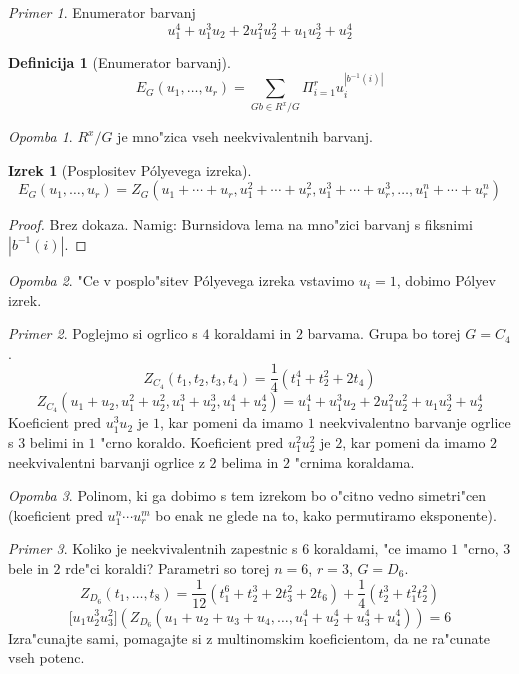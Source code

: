 \documentclass[a4paper,12pt]{article}
\theoremstyle{definition}
\newtheorem{defn}[counter]{Definicija}
\newtheorem{theorem}[counter]{Izrek}
\theoremstyle{remark}
\newtheorem*{ex}{Primer}
\newtheorem*{rem}{Opomba}
\begin{document}
\label{TODO: tega lani ni blo, tkoda ne znam nc dopisat}
\begin{ex}
	Enumerator barvanj
	\[ u_1^4 + u_1^3u_2 + 2u_1^2u_2^2+u_1u_2^3+u_2^4 \]
\end{ex}
\begin{defn}[Enumerator barvanj]
	$$ E_G(u_1, \ldots, u_r) = \sum_{Gb \in R^x/G} \Pi_{i=1}^r u_i^{ |b^{-1}(i)| } $$
\end{defn}
\begin{rem}
	$R^x/G$ je mno"zica vseh neekvivalentnih barvanj.
\end{rem}

\begin{theorem}[Posplositev P\'{o}lyevega izreka]
	\[ E_G(u_1, \ldots, u_r) = Z_G(u_1 + \cdots + u_r, u^2_1 + \cdots + u^2_r, u^3_1 + \cdots + u^3_r, \ldots, u^n_1 + \cdots + u^n_r) \]
\end{theorem}
\begin{proof}
	Brez dokaza. Namig: Burnsidova lema na mno"zici barvanj s fiksnimi $|b^{-1}(i)|$.
\end{proof}
\begin{rem}\label{TODO: elaborate, I don't see it}
	"Ce v posplo"sitev P\'{o}lyevega izreka vstavimo $u_i = 1$, dobimo P\'{o}lyev izrek.
\end{rem}

\begin{ex}
	Poglejmo si ogrlico s $4$ koraldami in $2$ barvama. Grupa bo torej $G = C_4$.
	\[ Z_{C_4}(t_1, t_2, t_3, t_4) = \frac{1}{4}(t_1^4 + t_2^2 + 2t_4) \]
	\[ Z_{C_4}(u_1+u_2, u_1^2+u_2^2, u_1^3+u_2^3, u_1^4+u_2^4) = u_1^4 + u_1^3u_2 + 2u_1^2u_2^2 + u_1u_2^3 + u_2^4\]
	Koeficient pred $u_1^3u_2$ je $1$, kar pomeni da imamo $1$ neekvivalentno barvanje ogrlice s $3$ belimi in $1$ "crno koraldo. Koeficient pred $u_1^2u_2^2$ je $2$, kar pomeni da imamo $2$ neekvivalentni barvanji ogrlice z $2$ belima in $2$ "crnima koraldama.
\end{ex}

\begin{rem}
	Polinom, ki ga dobimo s tem izrekom bo o"citno vedno simetri"cen (koeficient pred $u_1^n\cdots u_r^m$ bo enak ne glede na to, kako permutiramo eksponente).
\end{rem}

\begin{ex}
	Koliko je neekvivalentnih zapestnic s $6$ koraldami, "ce imamo $1$ "crno, $3$ bele in $2$ rde"ci koraldi? Parametri so torej $n=6$, $r=3$, $G=D_6$.
	\[Z_{D_6}(t_1, \ldots, t_8) = \frac{1}{12}(t_1^6+t_2^3+2t_3^2+2t_6)+\frac{1}{4}(t_2^3+t_1^2t_2^2)\]
	\[ \lbrack u_1 u_2^3 u_3^2 \rbrack\left(Z_{D_6}(u_1 + u_2 + u_3 + u_4, \ldots, u^4_1 + u^4_2 + u^4_3 + u^4_4)\right) = 6\]
	Izra"cunajte sami, pomagajte si z multinomskim koeficientom, da ne ra"cunate vseh potenc.
\end{ex}
\end{document}
